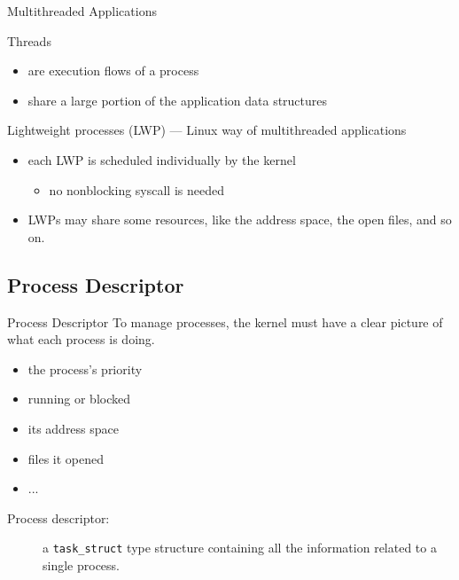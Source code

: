 \begin{frame}{Multithreaded Applications}
  \begin{block}{Threads}
    \begin{itemize}
    \item are execution flows of a process
    \item share a large portion of the application data structures
    \end{itemize}
  \end{block}
  \begin{block}{Lightweight processes (LWP) --- Linux way of multithreaded
      applications}
    \begin{itemize}
    \item each LWP is scheduled individually by the kernel
      \begin{itemize}
      \item no nonblocking syscall is needed
      \end{itemize}
    \item LWPs may share some resources, like the address space, the
      open files, and so on.
    \end{itemize}
  \end{block}
\end{frame}

\subsection{Process Descriptor}

\begin{frame}{Process Descriptor}
  To manage processes, the kernel must have a clear picture of what each process is doing.
  \begin{itemize}
  \item the process's priority
  \item running or blocked
  \item its address space
  \item files it opened
  \item ...
  \end{itemize}
  \begin{description}
  \item[Process descriptor:] a \texttt{task\_struct} type structure containing
    all the information related to a single process.
  \end{description}
  \begin{center}
  \end{center}
\end{frame}


